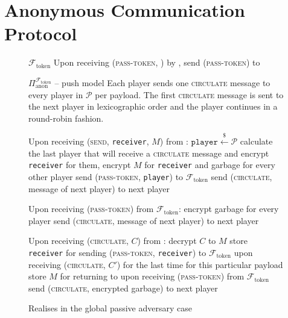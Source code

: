\section{Anonymous Communication Protocol}
  \label{sec:anonprot}

  \begin{figure}[H]
    \begin{systembox}{$\mathcal{F}_{\mathrm{token}}$}
      Upon receiving (\textsc{pass-token}, \bob) by \alice, send
      (\textsc{pass-token}) to \bob
    \end{systembox}
    \caption{}
    \label{alg:tokenfunc}
  \end{figure}

  \begin{figure}[H]
    \begin{protocolbox}{$\Pi_{\mathrm{anon}}^{\mathcal{F}_{\mathrm{token}}}$ --
    push model}
      Each player sends one \textsc{circulate} message to every player in
      $\mathcal{P}$ per payload. The first
      \textsc{circulate} message is sent to the next player in lexicographic
      order and the player continues in a round-robin fashion. 
      \begin{algorithmic}[1]
        \State Upon receiving (\textsc{send}, \texttt{receiver}, $M$) from
        \environment:
        \Indent
          \State $\mathtt{player} \overset{\$}{\gets} \mathcal{P}$
          \State calculate the last player that will receive a
          \textsc{circulate} message and encrypt \texttt{receiver} for them,
          encrypt $M$ for \texttt{receiver} and garbage for every other player
            \State send (\textsc{pass-token}, \texttt{player}) to
            $\mathcal{F}_{\mathrm{token}}$
          \Else
            \State send (\textsc{circulate}, message of next player) to next
            player
          \EndIf
        \EndIndent
        \Statex

        \State Upon receiving (\textsc{pass-token}) from
        $\mathcal{F}_{\mathrm{token}}$:
        \Indent
          \State encrypt garbage for every player
          \State send (\textsc{circulate}, message of next player) to next
          player
        \EndIndent
        \Statex

        \State Upon receiving (\textsc{circulate}, $C$) from \bob:
        \Indent
          \State decrypt $C$ to $M$
            \State store \texttt{receiver} for sending (\textsc{pass-token},
            \texttt{receiver}) to $\mathcal{F}_{\mathrm{token}}$ upon receiving
            (\textsc{circulate}, $C'$) for the last time for this particular
            payload
            \State store $M$ for returning to \environment upon receiving
            (\textsc{pass-token}) from $\mathcal{F}_{\mathrm{token}}$
          \EndIf
          \State send (\textsc{circulate}, encrypted garbage) to next player
        \EndIndent
      \end{algorithmic}
    \end{protocolbox}
    \caption{Realises \anonfunc in the global passive adversary case}
    \label{alg:anonprot:push}
  \end{figure}
